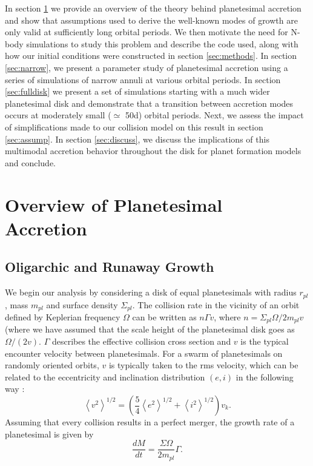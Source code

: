 \documentclass[twocolumn]{aastex63}
\begin{document}
In section \ref{sec:theory} we provide an overview of the theory
behind planetesimal accretion and show that assumptions used to derive
the well-known modes of growth are only valid at sufficiently long
orbital periods. We then motivate the need for N-body simulations to
study this problem and describe the code used, along with how our
initial conditions were constructed in section \ref{sec:methods}. In
section \ref{sec:narrow}, we present a parameter study of planetesimal
accretion using a series of simulations of narrow annuli at various
orbital periods. In section \ref{sec:fulldisk} we present a set of simulations starting with a much wider planetesimal disk and demonstrate that a transition between accretion modes occurs at moderately small ($\simeq$ 50d) orbital periods. Next, we assess the impact of simplifications made to our collision model on this result in section \ref{sec:assump}. In section \ref{sec:discuss}, we discuss the implications of this multimodal accretion behavior throughout the disk for planet formation models and conclude.

\section{Overview of Planetesimal Accretion}\label{sec:theory}

\subsection{Oligarchic and Runaway Growth}

We begin our analysis by considering a disk of equal planetesimals
with radius $r_{pl}$, mass $m_{pl}$ and surface density
$\Sigma_{pl}$. The collision rate in the vicinity of an orbit defined
by Keplerian frequency $\Omega$ can be written as $n \Gamma v$, where
$n = \Sigma_{pl} \Omega / 2 m_{pl} v$ (where we have assumed that the scale height of the planetesimal disk goes as $\Omega/(2v)$. $\Gamma$ describes the effective
collision cross section and $v$ is the typical encounter velocity
between planetesimals.
For a swarm of planetesimals on randomly oriented orbits, $v$ is typically
taken to the rms velocity, which can be related to the eccentricity and inclination distribution $(e, i)$ in the following way \citep{lissauer93}:
\begin{equation}\label{eq:ecc_vel}
	\left< v^{2} \right>^{1/2} = \left( \frac{5}{4} \left< e^{2} \right>^{1/2} + \left< i^{2} \right>^{1/2}  \right) v_{k}.
\end{equation}
Assuming that every collision results in a perfect merger, the growth rate of a planetesimal is given by
\begin{equation}\label{eq:growth}
	\frac{dM}{dt} = \frac{\Sigma \Omega}{2 m_{pl}} \Gamma.
\end{equation}
\end{document}

